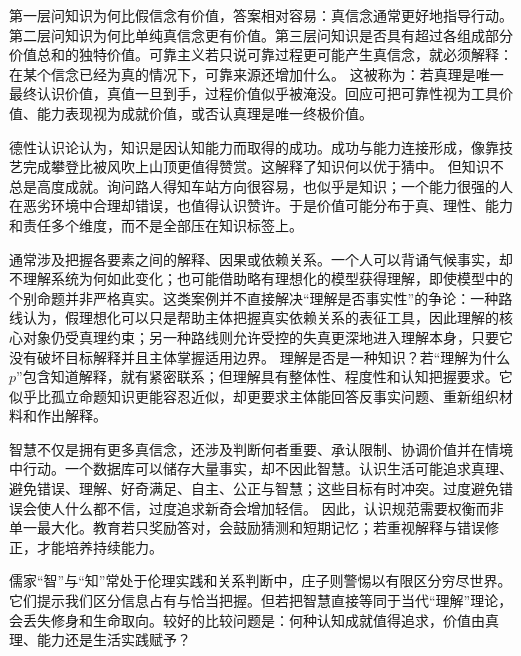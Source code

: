 第一层问知识为何比假信念有价值，答案相对容易：真信念通常更好地指导行动。第二层问知识为何比单纯真信念更有价值。第三层问知识是否具有超过各组成部分价值总和的独特价值。可靠主义若只说可靠过程更可能产生真信念，就必须解释：在某个信念已经为真的情况下，可靠来源还增加什么。 这被称为：若真理是唯一最终认识价值，真值一旦到手，过程价值似乎被淹没\parencite{kvanvig2003}。回应可把可靠性视为工具价值、能力表现视为成就价值，或否认真理是唯一终极价值。

德性认识论认为，知识是因认知能力而取得的成功。成功与能力连接形成，像靠技艺完成攀登比被风吹上山顶更值得赞赏。这解释了知识何以优于猜中。 但知识不总是高度成就。询问路人得知车站方向很容易，也似乎是知识；一个能力很强的人在恶劣环境中合理却错误，也值得认识赞许。于是价值可能分布于真、理性、能力和责任多个维度，而不是全部压在知识标签上。

通常涉及把握各要素之间的解释、因果或依赖关系。一个人可以背诵气候事实，却不理解系统为何如此变化；也可能借助略有理想化的模型获得理解，即使模型中的个别命题并非严格真实\parencite{grimm2006,riggs2003}。这类案例并不直接解决“理解是否事实性”的争论：一种路线认为，假理想化可以只是帮助主体把握真实依赖关系的表征工具，因此理解的核心对象仍受真理约束；另一种路线则允许受控的失真更深地进入理解本身，只要它没有破坏目标解释并且主体掌握适用边界\parencite{elgin2017,khalifa2017}。 理解是否是一种知识？若“理解为什么$p$”包含知道解释，就有紧密联系；但理解具有整体性、程度性和认知把握要求。它似乎比孤立命题知识更能容忍近似，却更要求主体能回答反事实问题、重新组织材料和作出解释。

智慧不仅是拥有更多真信念，还涉及判断何者重要、承认限制、协调价值并在情境中行动。一个数据库可以储存大量事实，却不因此智慧。认识生活可能追求真理、避免错误、理解、好奇满足、自主、公正与智慧；这些目标有时冲突。过度避免错误会使人什么都不信，过度追求新奇会增加轻信。 因此，认识规范需要权衡而非单一最大化。教育若只奖励答对，会鼓励猜测和短期记忆；若重视解释与错误修正，才能培养持续能力。

\begin{comparison}
儒家“智”与“知”常处于伦理实践和关系判断中，庄子则警惕以有限区分穷尽世界\parencite{analects2003,zhuangzi2009}。它们提示我们区分信息占有与恰当把握。但若把智慧直接等同于当代“理解”理论，会丢失修身和生命取向。较好的比较问题是：何种认知成就值得追求，价值由真理、能力还是生活实践赋予？
\end{comparison}

